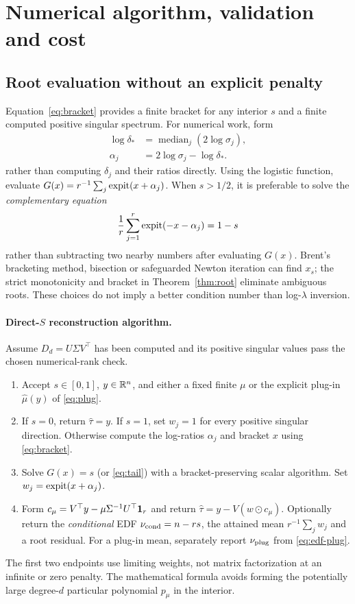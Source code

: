 \section{Numerical algorithm, validation and cost}\label{sec:algorithm}

\subsection{Root evaluation without an explicit penalty}
Equation~\eqref{eq:bracket} provides a finite bracket
for any interior $s$ and a finite computed positive singular
spectrum. For numerical work, form
\[
\begin{aligned}
\log\delta_*&=\operatorname{median}_j(2\log\sigma_j),\\
\alpha_j&=2\log\sigma_j-\log\delta_*.
\end{aligned}
\]
rather than computing $\delta_j$ and their ratios directly.
Using the logistic function, evaluate
$G(x)=r^{-1}\sum_j\operatorname{expit}(x+\alpha_j)$.
When $s>1/2$, it is preferable to solve the
\emph{complementary equation}
\begin{equation}\label{eq:tail}
\frac1r\sum_{j=1}^r\operatorname{expit}(-x-\alpha_j)=1-s
\end{equation}
rather than subtracting two nearby numbers after evaluating $G(x)$.
Brent's bracketing method, bisection or safeguarded Newton iteration
can find $x_s$; the strict monotonicity and bracket in
Theorem~\ref{thm:root} eliminate ambiguous roots. These choices
do not imply a better condition number than log-$\lambda$
inversion.

\paragraph{Direct-$S$ reconstruction algorithm.}
Assume $D_d=U\Sigma V^\top$ has been computed and its positive
singular values pass the chosen numerical-rank check.
\begin{enumerate}
\item Accept $s\in[0,1]$, $y\in\mathbb R^n$, and either a fixed finite
$\mu$ or the explicit plug-in $\widehat\mu(y)$ of \eqref{eq:plug}.
\item If $s=0$, return $\widehat\tau=y$. If $s=1$,
set $w_j=1$ for every positive singular direction.
Otherwise compute the log-ratios $\alpha_j$ and
bracket $x$ using \eqref{eq:bracket}.
\item Solve $G(x)=s$ (or \eqref{eq:tail}) with
a bracket-preserving scalar algorithm. Set
$w_j=\operatorname{expit}(x+\alpha_j)$.
\item Form $c_\mu=V^\top y-\mu\Sigma^{-1}U^\top\mathbf 1_r$
and return $\widehat\tau=y-V(w\odot c_\mu)$.
Optionally return the \emph{conditional} EDF
$\nu_{\rm cond}=n-rs$, the attained mean
$r^{-1}\sum_jw_j$ and a root residual.
For a plug-in mean, separately report
$\nu_{\rm plug}$ from \eqref{eq:edf-plug}.
\end{enumerate}
The first two endpoints use limiting weights, not matrix
factorization at an infinite or zero penalty. The mathematical
formula avoids forming the potentially large degree-$d$
particular polynomial $p_\mu$ in the interior.

